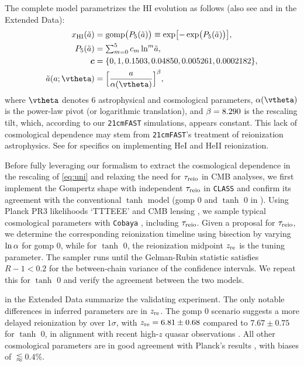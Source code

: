 The complete model parametrizes the HI evolution as follows (also see
 and  in the Extended Data):
%
\begin{align}
\label{eq:uni}
x_\HI(\ar) &= \gomp\bigl( P_5(\ar) \bigr)
  \equiv \exp\bigl[ - \exp\bigl( P_5(\ar) \bigr) \bigr], \\
%
\label{eq:poly}
P_5(\ar) &= {\textstyle\sum}_{m=0}^5 \, c_m \ln^m\!\ar, \\
%
\bm{c} &= \{0, 1, 0.1503, 0.04850, 0.005261, 0.0002182\}, \nonumber\\
%
\label{eq:map}
\ar(a; \vtheta) &= \Bigl[ \frac{a}{\ap(\vtheta)} \Bigr]^\tilt,
\end{align}
%
where $\vtheta$ denotes 6 astrophysical and cosmological parameters,
$\ap(\vtheta)$ is the power-law pivot (or logarithmic translation), and
$\beta = 8.290$ is the rescaling tilt, which, according to our
\texttt{21cmFAST} simulations, appears constant.
This lack of cosmological dependence may stem from \texttt{21cmFAST}'s
treatment of reionization astrophysics.
See  for specifics on implementing HeI and HeII
reionization.

Before fully leveraging our formalism to extract the cosmological
dependence in the rescaling of \cref{eq:uni} and relaxing the
need for $\tau_{\mathrm{reio}}$ in CMB analyses, we first implement the Gompertz
shape with independent $\tau_{\mathrm{reio}}$ in \texttt{CLASS} and confirm its
agreement with the conventional $\tanh$ model (gomp 0 and $\tanh$ 0 in ).
Using Planck PR3 likelihoods `TTTEEE' \cite{Planck2020c} and CMB
lensing \cite{Planck2020d}, we sample typical cosmological parameters
with \texttt{Cobaya} \cite{Torrado2020}, including $\tau_{\mathrm{reio}}$. Given a proposal for
$\tau_{\mathrm{reio}}$, we determine the corresponding reionization timeline using bisection by varying
$\ln\alpha$ for gomp 0, while for $\tanh$ 0,
the reionization midpoint $z_{\mathrm{re}}$ is the tuning parameter.
The sampler runs until the Gelman-Rubin statistic \cite{Gelman1992}
satisfies $R - 1 < 0.2$ for the between-chain variance of the confidence
intervals.
We repeat this for $\tanh$ 0 and verify the agreement between the two models.

 in the Extended Data summarize the validating
experiment.
The only notable differences in inferred parameters are in $z_{\mathrm{re}}$.
The gomp 0 scenario suggests a more delayed reionization by over
$1\sigma$, with $z_{\mathrm{re}} = 6.81 \pm 0.68$ compared to $7.67 \pm 0.75$ for
$\tanh$ 0, in alignment with recent high-$z$ quasar observations
\cite{Keating2020}.
All other cosmological parameters are in good agreement with Planck's
results \cite{Planck2020a}, with biases of $\lessapprox 0.4 \%$.

